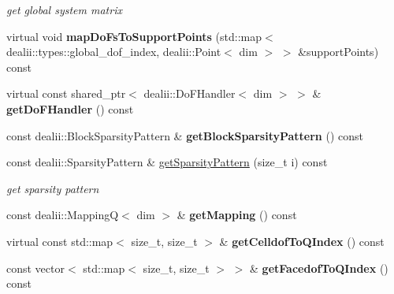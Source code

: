 \begin{DoxyCompactItemize}
\begin{DoxyCompactList}\small\item\em get global system matrix \item\end{DoxyCompactList}\item 
\hypertarget{classnatrium_1_1SEDGMinLee_ac1f5ecd80111566dd53804b6db2a1cb3}{
virtual void {\bfseries mapDoFsToSupportPoints} (std::map$<$ dealii::types::global\_\-dof\_\-index, dealii::Point$<$ dim $>$ $>$ \&supportPoints) const }
\label{classnatrium_1_1SEDGMinLee_ac1f5ecd80111566dd53804b6db2a1cb3}

\item 
\hypertarget{classnatrium_1_1SEDGMinLee_a3ffd3d7bc5aae9dbb5a021d7e4913f65}{
virtual const shared\_\-ptr$<$ dealii::DoFHandler$<$ dim $>$ $>$ \& {\bfseries getDoFHandler} () const }
\label{classnatrium_1_1SEDGMinLee_a3ffd3d7bc5aae9dbb5a021d7e4913f65}

\item 
\hypertarget{classnatrium_1_1SEDGMinLee_a10acabaac20a992130e88fb9bd395d31}{
const dealii::BlockSparsityPattern \& {\bfseries getBlockSparsityPattern} () const }
\label{classnatrium_1_1SEDGMinLee_a10acabaac20a992130e88fb9bd395d31}

\item 
const dealii::SparsityPattern \& \hyperlink{classnatrium_1_1SEDGMinLee_ac9392932aaab8186b427b9d12bc64771}{getSparsityPattern} (size\_\-t i) const 
\begin{DoxyCompactList}\small\item\em get sparsity pattern \item\end{DoxyCompactList}\item 
\hypertarget{classnatrium_1_1SEDGMinLee_ab888ac14b8ef33ed706b5d63deea86ae}{
const dealii::MappingQ$<$ dim $>$ \& {\bfseries getMapping} () const }
\label{classnatrium_1_1SEDGMinLee_ab888ac14b8ef33ed706b5d63deea86ae}

\item 
\hypertarget{classnatrium_1_1SEDGMinLee_aec38323cbd34487a73b4f62f0a310ceb}{
virtual const std::map$<$ size\_\-t, size\_\-t $>$ \& {\bfseries getCelldofToQIndex} () const }
\label{classnatrium_1_1SEDGMinLee_aec38323cbd34487a73b4f62f0a310ceb}

\item 
\hypertarget{classnatrium_1_1SEDGMinLee_a8b7d94c90ccfa5e341d854059d883f57}{
const vector$<$ std::map$<$ size\_\-t, size\_\-t $>$ $>$ \& {\bfseries getFacedofToQIndex} () const }
\label{classnatrium_1_1SEDGMinLee_a8b7d94c90ccfa5e341d854059d883f57}


\end{DoxyCompactItemize}

